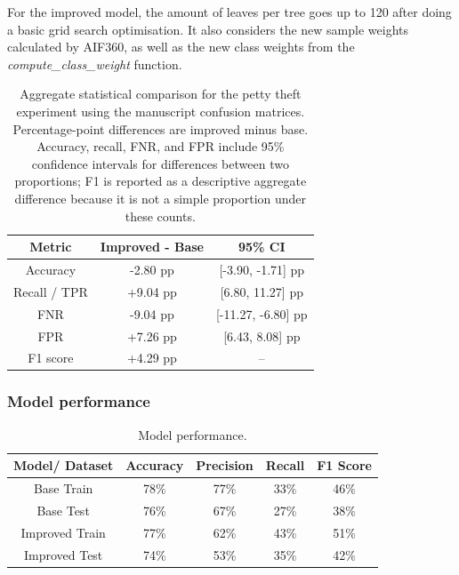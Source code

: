 \documentclass[fleqn,10pt]{wlscirep}
\begin{document}
For the improved model, the amount of leaves per tree goes up to 120 after doing a basic grid search optimisation. It also considers the new sample weights calculated by AIF360, as well as the new class weights from the \textit{compute\_class\_weight} function.

\begin{table}[!htb]
\centering
\begin{tabular}{|c|c|c|}
\hline
\textbf{Metric} & \textbf{Improved - Base} & \textbf{95\% CI} \\ \hline
Accuracy & -2.80 pp & [-3.90, -1.71] pp \\ 
Recall / TPR & +9.04 pp & [6.80, 11.27] pp \\ 
FNR & -9.04 pp & [-11.27, -6.80] pp \\ 
FPR & +7.26 pp & [6.43, 8.08] pp \\ 
F1 score & +4.29 pp & -- \\ \hline
\end{tabular}
\caption{Aggregate statistical comparison for the petty theft experiment using the manuscript confusion matrices. Percentage-point differences are improved minus base. Accuracy, recall, FNR, and FPR include 95\% confidence intervals for differences between two proportions; F1 is reported as a descriptive aggregate difference because it is not a simple proportion under these counts.}
\label{tab:pt_statistical_tests}
\end{table}

\subsubsection{Model performance}

\begin{table}[!htb]
\centering
\begin{tabular}{|c|c|c|c|c|}
\hline
        \textbf{Model/ Dataset} & \textbf{Accuracy} & \textbf{Precision} & \textbf{Recall} & \textbf{F1 Score} \\ \hline
        
        Base Train & 78\% & 77\% & 33\% & 46\% \\ 
        Base Test & 76\% & 67\% & 27\% & 38\% \\ 
        Improved Train & 77\% & 62\% & 43\% & 51\% \\ 
        Improved Test & 74\% & 53\% & 35\% & 42\% \\ 
        \hline

    \end{tabular}
\caption{Model performance.}
\label{tab_perf_hfalta:}
\end{table}
\end{document}

